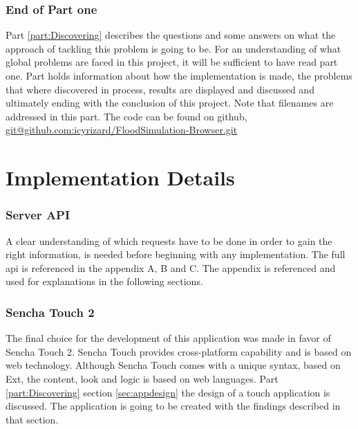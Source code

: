 
\section*{End of Part one}
Part \ref{part:Discovering} describes the questions and some answers on what the approach of tackling this problem is going to be. For an understanding of what global problems are faced in this project, it will be sufficient to have read part one. Part \ref{part:implementation} holds information about how the implementation is made, the problems that where discovered in process, results are displayed and discussed and ultimately ending with the conclusion of this project. Note that filenames are addressed in this part. The code can be found on github, \url{git@github.com:icyrizard/FloodSimulation-Browser.git}

\part{Implementation Details}
\label{part:implementation}
\section{Server API}
A clear understanding of which requests have to be done in order to gain the right information, is needed before beginning with any implementation. The full api is referenced in the appendix A, B and C. The appendix is referenced and used for explanations in the following sections.

\section{Sencha Touch 2}
The final choice for the development of this application was made in favor of Sencha Touch 2.  Sencha Touch provides cross-platform capability and is based on web technology. Although Sencha Touch comes with a unique syntax, based on Ext, the content, look and logic is based on web languages.
Part \ref{part:Discovering} section \ref{sec:appdesign} the design of a touch application is discussed. The application is going to be created with the findings described in that section. 

